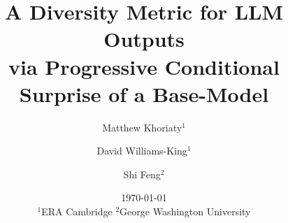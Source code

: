 \documentclass[11pt]{article}
\title{A Diversity Metric for LLM Outputs\\via Progressive Conditional Surprise of a Base-Model}
\author{Matthew Khoriaty$^1$ \and David Williams-King$^1$ \and Shi Feng$^2$}
\date{\today\\[1em]\small $^1$ERA Cambridge \quad $^2$George Washington University}
\begin{document}
\maketitle

\begin{abstract}

\end{abstract}























\appendix





\end{document}
